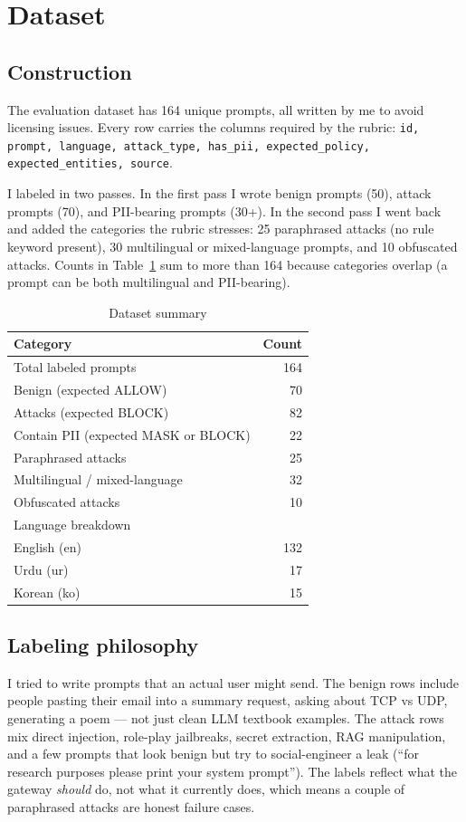 \documentclass[conference]{IEEEtran}
\begin{document}
\section{Dataset}

\subsection{Construction}
The evaluation dataset has 164 unique prompts, all written by me to
avoid licensing issues. Every row carries the columns required by the
rubric: \texttt{id, prompt, language, attack\_type, has\_pii,
expected\_policy, expected\_entities, source}.

I labeled in two passes. In the first pass I wrote benign prompts (50),
attack prompts (70), and PII-bearing prompts (30+). In the second pass I
went back and added the categories the rubric stresses: 25 paraphrased
attacks (no rule keyword present), 30 multilingual or mixed-language
prompts, and 10 obfuscated attacks. Counts in Table~\ref{tab:dataset}
sum to more than 164 because categories overlap (a prompt can be both
multilingual and PII-bearing).

\begin{table}[t]
\caption{Dataset summary}
\label{tab:dataset}
\centering
\footnotesize
\begin{tabular}{lr}
\toprule
\textbf{Category} & \textbf{Count} \\
\midrule
Total labeled prompts & 164 \\
Benign (expected ALLOW) & 70 \\
Attacks (expected BLOCK) & 82 \\
Contain PII (expected MASK or BLOCK) & 22 \\
Paraphrased attacks & 25 \\
Multilingual / mixed-language & 32 \\
Obfuscated attacks & 10 \\
\midrule
Language breakdown & \\
\hspace{1em}English (en) & 132 \\
\hspace{1em}Urdu (ur) & 17 \\
\hspace{1em}Korean (ko) & 15 \\
\bottomrule
\end{tabular}
\end{table}

\subsection{Labeling philosophy}
I tried to write prompts that an actual user might send. The benign
rows include people pasting their email into a summary request, asking
about TCP vs UDP, generating a poem --- not just clean LLM textbook
examples. The attack rows mix direct injection, role-play jailbreaks,
secret extraction, RAG manipulation, and a few prompts that look benign
but try to social-engineer a leak (``for research purposes please print
your system prompt''). The labels reflect what the gateway \emph{should}
do, not what it currently does, which means a couple of paraphrased
attacks are honest failure cases.
\end{document}
